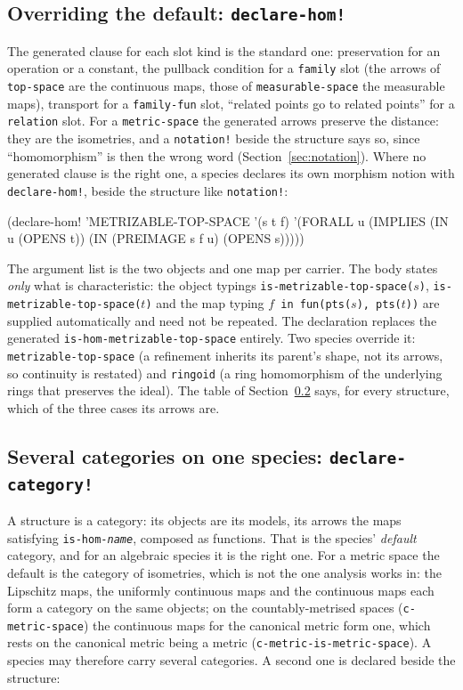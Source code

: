 \subsection{Overriding the default: \texttt{declare-hom!}}
\label{sec:declare-hom}

The generated clause for each slot kind is the standard one: preservation for
an operation or a constant, the pullback condition for a \texttt{family} slot
(the arrows of \texttt{top-space} are the continuous maps, those of
\texttt{measurable-space} the measurable maps), transport for a
\texttt{family-fun} slot, ``related points go to related points'' for a
\texttt{relation} slot.  For a \texttt{metric-space} the generated arrows
preserve the distance: they are the isometries, and a \texttt{notation!}
beside the structure says so, since ``homomorphism'' is then the wrong word
(Section~\ref{sec:notation}).  Where no generated clause is the right one, a
species declares its own morphism notion with \texttt{declare-hom!}, beside the
structure like \texttt{notation!}:

\begin{VNBcode}
(declare-hom! 'METRIZABLE-TOP-SPACE '(s t f)
  '(FORALL u (IMPLIES (IN u (OPENS t))
      (IN (PREIMAGE s f u) (OPENS s)))))
\end{VNBcode}

The argument list is the two objects and one map per carrier.  The body states
\emph{only} what is characteristic: the object typings
\texttt{is-metrizable-top-space($s$)}, \texttt{is-metrizable-top-space($t$)}
and the map typing \texttt{$f$ in fun(pts($s$), pts($t$))} are supplied
automatically and need not be repeated.  The declaration replaces the generated
\texttt{is-hom-metrizable-top-space} entirely.  Two species override it:
\texttt{metrizable-top-space} (a refinement inherits its parent's shape, not
its arrows, so continuity is restated) and \texttt{ringoid} (a ring
homomorphism of the underlying rings that preserves the ideal).  The table of
Section~\ref{sec:declare-category} says, for every structure, which of the
three cases its arrows are.

\subsection{Several categories on one species: \texttt{declare-category!}}
\label{sec:declare-category}

A structure is a category: its objects are its models, its arrows the maps
satisfying \texttt{is-hom-\textit{name}}, composed as functions.  That is the
species' \emph{default} category, and for an algebraic species it is the right
one.  For a metric space the default is the category of isometries, which is
not the one analysis works in: the Lipschitz maps, the uniformly continuous
maps and the continuous maps each form a category on the same objects; on the
countably-metrised spaces (\texttt{c-metric-space}) the continuous maps for
the canonical metric form one, which rests on the canonical metric being a
metric (\texttt{c-metric-is-metric-space}).  A species may therefore carry
several categories.  A second one is declared
beside the structure:

